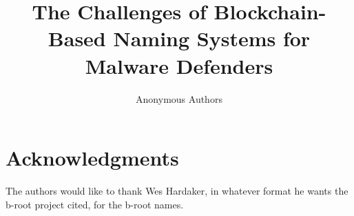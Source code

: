 \documentclass[conference]{IEEEtran}
\begin{document}
\author{Anonymous Authors}

\title{The Challenges of Blockchain-Based Naming Systems for Malware Defenders}





\maketitle
\pagestyle{plain}











\section{Acknowledgments}

The authors would like to thank Wes Hardaker, in whatever format he wants the 
b-root project cited, for the b-root names.




%
\end{document}
